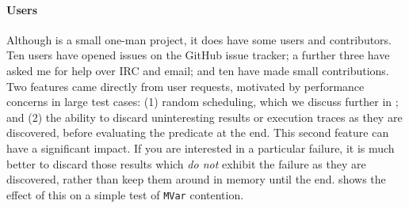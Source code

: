 \paragraph{Users}
Although \dejafu{} is a small one-man project, it does have some users
and contributors.  Ten users have opened issues on the GitHub issue
tracker; a further three have asked me for help over IRC and email;
and ten have made small contributions.  Two features came directly
from user requests, motivated by performance concerns in large test
cases: (1) random scheduling, which we discuss further in
; and (2) the ability to discard uninteresting
results or execution traces as they are discovered, before evaluating
the predicate at the end.  This second feature can have a significant
impact.  If you are interested in a particular failure, it is much
better to discard those results which \emph{do not} exhibit the
failure as they are discovered, rather than keep them around in memory
until the end.   shows the effect of this on a
simple test of \verb|MVar| contention.

